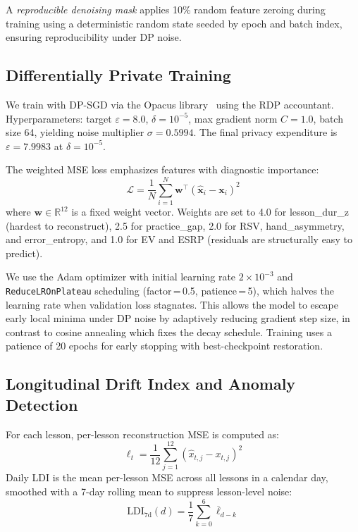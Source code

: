 A \emph{reproducible denoising mask} applies 10\% random feature zeroing
during training using a deterministic random state seeded by epoch and
batch index, ensuring reproducibility under DP noise.

\subsection{Differentially Private Training}
\label{sec:dp}

We train with DP-SGD via the Opacus library~\cite{yousefpour2021opacus}
using the RDP accountant.
Hyperparameters: target \(\varepsilon{=}8.0\), \(\delta{=}10^{-5}\),
max gradient norm \(C{=}1.0\), batch size 64, yielding noise multiplier
\(\sigma{=}0.5994\).
The final privacy expenditure is \(\varepsilon{=}7.9983\) at \(\delta{=}10^{-5}\).

The weighted MSE loss emphasizes features with diagnostic importance:
\begin{equation}
  \mathcal{L} = \frac{1}{N}\sum_{i=1}^{N} \mathbf{w}^\top (\hat{\mathbf{x}}_i - \mathbf{x}_i)^2
  \label{eq:loss}
\end{equation}
where \(\mathbf{w} \in \mathbb{R}^{12}\) is a fixed weight vector.
Weights are set to 4.0 for lesson\_dur\_z (hardest to reconstruct),
2.5 for practice\_gap, 2.0 for RSV, hand\_asymmetry, and error\_entropy,
and 1.0 for EV and ESRP (residuals are structurally easy to predict).

We use the Adam optimizer with initial learning rate \(2\times10^{-3}\) and
\texttt{ReduceLROnPlateau} scheduling (factor\,=\,0.5, patience\,=\,5),
which halves the learning rate when validation loss stagnates.
This allows the model to escape early local minima under DP noise by
adaptively reducing gradient step size, in contrast to cosine annealing which
fixes the decay schedule.
Training uses a patience of 20 epochs for early stopping with best-checkpoint
restoration.

\subsection{Longitudinal Drift Index and Anomaly Detection}
\label{sec:ldi}

For each lesson, per-lesson reconstruction MSE is computed as:
\[
  \ell_t = \frac{1}{12}\sum_{j=1}^{12}(\hat{x}_{t,j} - x_{t,j})^2
\]
Daily LDI is the mean per-lesson MSE across all lessons in a calendar day,
smoothed with a 7-day rolling mean to suppress lesson-level noise:
\[
  \text{LDI}_{7\text{d}}(d) = \frac{1}{7}\sum_{k=0}^{6}\overline{\ell}_{d-k}
\]

